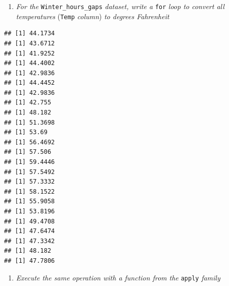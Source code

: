 \documentclass[
]{article}
\newenvironment{Shaded}{\begin{snugshade}}{\end{snugshade}}
\newcommand{\ControlFlowTok}[1]{\textcolor[rgb]{0.13,0.29,0.53}{\textbf{#1}}}
\newcommand{\DecValTok}[1]{\textcolor[rgb]{0.00,0.00,0.81}{#1}}
\newcommand{\FloatTok}[1]{\textcolor[rgb]{0.00,0.00,0.81}{#1}}
\newcommand{\FunctionTok}[1]{\textcolor[rgb]{0.13,0.29,0.53}{\textbf{#1}}}
\newcommand{\NormalTok}[1]{#1}
\newcommand{\OtherTok}[1]{\textcolor[rgb]{0.56,0.35,0.01}{#1}}
\newcommand{\SpecialCharTok}[1]{\textcolor[rgb]{0.81,0.36,0.00}{\textbf{#1}}}
\providecommand{\tightlist}{%
  \setlength{\itemsep}{0pt}\setlength{\parskip}{0pt}}
\begin{document}
\begin{enumerate}
\def\labelenumi{\arabic{enumi}.}
\setcounter{enumi}{1}
\tightlist
\item
  \emph{For the} \texttt{Winter\_hours\_gaps} \emph{dataset, write a} \texttt{for} \emph{loop to convert all temperatures} (\texttt{Temp} \emph{column}) \emph{to degrees Fahrenheit}
\end{enumerate}

\begin{Shaded}
\end{Shaded}

\begin{verbatim}
## [1] 44.1734
## [1] 43.6712
## [1] 41.9252
## [1] 44.4002
## [1] 42.9836
## [1] 44.4452
## [1] 42.9836
## [1] 42.755
## [1] 48.182
## [1] 51.3698
## [1] 53.69
## [1] 56.4692
## [1] 57.506
## [1] 59.4446
## [1] 57.5492
## [1] 57.3332
## [1] 58.1522
## [1] 55.9058
## [1] 53.8196
## [1] 49.4708
## [1] 47.6474
## [1] 47.3342
## [1] 48.182
## [1] 47.7806
\end{verbatim}

\begin{enumerate}
\def\labelenumi{\arabic{enumi}.}
\setcounter{enumi}{2}
\tightlist
\item
  \emph{Execute the same operation with a function from the} \texttt{apply} \emph{family}
\end{enumerate}

\begin{Shaded}
\end{Shaded}
\end{document}
